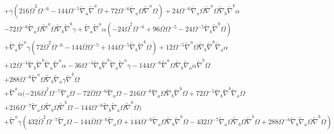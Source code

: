 \documentclass[10pt,letterpaper]{article}
\numberwithin{equation}{section}
\begin{document}
\begin{eqnarray}
&& + \overset{..}{\gamma} (216 \dot{\Omega}^2 \Omega^{-6} - 144 \Omega^{-5} \tilde{\nabla}_{a}\tilde{\nabla}^{a}\Omega + 72 \Omega^{-6} \tilde{\nabla}_{a}\Omega \tilde{\nabla}^{a}\Omega) + 24 \Omega^{-6} \tilde{\nabla}_{a}\Omega \tilde{\nabla}^{a}\Omega \tilde{\nabla}_{b}\tilde{\nabla}^{b}\alpha \nonumber \\ 
&& - 72 \Omega^{-6} \tilde{\nabla}_{a}\Omega \tilde{\nabla}^{a}\Omega \tilde{\nabla}_{b}\tilde{\nabla}^{b}\gamma + \tilde{\nabla}_{a}\tilde{\nabla}^{a}\alpha (-24 \dot{\Omega}^2 \Omega^{-6} + 96 \overset{..}{\Omega} \Omega^{-5} - 24 \Omega^{-5} \tilde{\nabla}_{b}\tilde{\nabla}^{b}\Omega) \nonumber \\ 
&& + \tilde{\nabla}_{a}\tilde{\nabla}^{a}\gamma (72 \dot{\Omega}^2 \Omega^{-6} - 144 \overset{..}{\Omega} \Omega^{-5} + 144 \Omega^{-5} \tilde{\nabla}_{b}\tilde{\nabla}^{b}\Omega) + 12 \Omega^{-5} \tilde{\nabla}^{a}\Omega \tilde{\nabla}_{b}\tilde{\nabla}^{b}\tilde{\nabla}_{a}\alpha \nonumber \\ 
&& + 12 \Omega^{-4} \tilde{\nabla}_{b}\tilde{\nabla}^{b}\tilde{\nabla}_{a}\tilde{\nabla}^{a}\alpha - 36 \Omega^{-4} \tilde{\nabla}_{b}\tilde{\nabla}^{b}\tilde{\nabla}_{a}\tilde{\nabla}^{a}\gamma - 144 \Omega^{-6} \tilde{\nabla}^{a}\Omega \tilde{\nabla}_{b}\tilde{\nabla}_{a}\alpha \tilde{\nabla}^{b}\Omega \nonumber \\ 
&& + 288 \Omega^{-6} \tilde{\nabla}^{a}\Omega \tilde{\nabla}_{b}\tilde{\nabla}_{a}\gamma \tilde{\nabla}^{b}\Omega \nonumber \\ 
&& + \tilde{\nabla}^{a}\alpha (-216 \dot{\Omega}^2 \Omega^{-7} \tilde{\nabla}_{a}\Omega - 72 \overset{..}{\Omega} \Omega^{-6} \tilde{\nabla}_{a}\Omega - 216 \Omega^{-6} \tilde{\nabla}_{a}\Omega \tilde{\nabla}_{b}\tilde{\nabla}^{b}\Omega + 72 \Omega^{-5} \tilde{\nabla}_{b}\tilde{\nabla}^{b}\tilde{\nabla}_{a}\Omega \nonumber\\
&& + 216 \Omega^{-7} \tilde{\nabla}_{a}\Omega \tilde{\nabla}_{b}\Omega \tilde{\nabla}^{b}\Omega - 144 \Omega^{-6} \tilde{\nabla}_{b}\tilde{\nabla}_{a}\Omega \tilde{\nabla}^{b}\Omega) \nonumber \\ 
&& + \tilde{\nabla}^{a}\gamma (432 \dot{\Omega}^2 \Omega^{-7} \tilde{\nabla}_{a}\Omega - 144 \overset{..}{\Omega} \Omega^{-6} \tilde{\nabla}_{a}\Omega + 144 \Omega^{-6} \tilde{\nabla}_{a}\Omega \tilde{\nabla}_{b}\tilde{\nabla}^{b}\Omega - 432 \Omega^{-7} \tilde{\nabla}_{a}\Omega \tilde{\nabla}_{b}\Omega \tilde{\nabla}^{b}\Omega + 288 \Omega^{-6} \tilde{\nabla}_{b}\tilde{\nabla}_{a}\Omega \tilde{\nabla}^{b}\Omega) \nonumber \\ 

\end{eqnarray}
\end{document}
